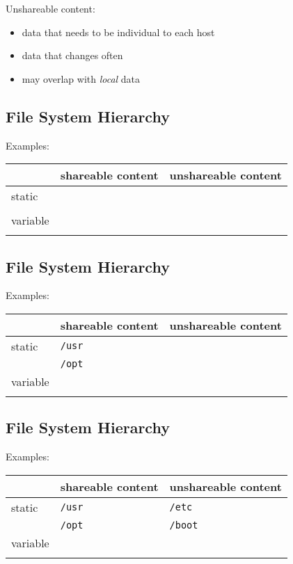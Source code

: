 \documentclass[xga]{xdvislides}
\begin{document}
Unshareable content:
\begin{itemize}
	\item data that needs to be individual to each host
	\item data that changes often
	\item may overlap with {\em local} data
\end{itemize}

\subsection{File System Hierarchy}
Examples:
\\

\begin{center}
\begin{tabular}{| l | l | l |}
	\hline
	& shareable content & unshareable content \\
	\hline
	static   & & \\
	         & & \\
	\hline
	variable & & \\
	         & & \\
	\hline
\end{tabular}
\end{center}


\subsection{File System Hierarchy}
Examples:
\\

\begin{center}
\begin{tabular}{| l | l | l |}
	\hline
	& shareable content & unshareable content \\
	\hline
	static   & \verb+/usr+ & \\
	         & \verb+/opt+ & \\
	\hline
	variable & & \\
	         & & \\
	\hline
\end{tabular}
\end{center}

\subsection{File System Hierarchy}
Examples:
\\

\begin{center}
\begin{tabular}{| l | l | l |}
	\hline
	& shareable content & unshareable content \\
	\hline
	static   & \verb+/usr+ & \verb+/etc+ \\
	         & \verb+/opt+ & \verb+/boot+ \\
	\hline
	variable & & \\
	         & & \\
	\hline
\end{tabular}
\end{center}
\end{document}
